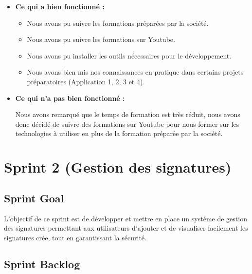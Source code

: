 \begin{itemize}
  \item \textbf{Ce qui a bien fonctionné :}
  \begin{itemize}
    \item Nous avons pu suivre les formations préparées par la société.
    \item Nous avons pu suivre les formations sur Youtube.
    \item Nous avons pu installer les outils nécessaires pour le développement.
    \item Nous avons bien mis nos connaissances en pratique dans certains projets préparatoires (Application 1, 2, 3 et 4).
  \end{itemize}
  \item \textbf{Ce qui n'a pas bien fonctionné :}
  
  Nous avons remarqué que le temps de formation est très réduit, nous avons donc décidé de suivre des formations sur Youtube pour nous former sur les technologies à utiliser en plus de la formation préparée par la société.
\end{itemize}

\section{Sprint 2 (Gestion des signatures)}

\subsection{Sprint Goal}

L'objectif de ce sprint est de développer et mettre en place un système de gestion des signatures permettant aux utilisateurs d'ajouter et de visualiser facilement les signatures crée, tout en garantissant la sécurité.

\subsection{Sprint Backlog}


